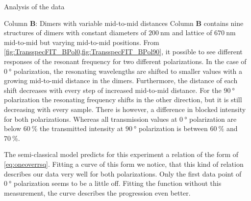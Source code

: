 \documentclass[pdftex, a4paper,11pt, twoside, UKenglish]{report}
\begin{document}
\begin{chapter}{Analysis of the data}
    \newpage
    \begin{section}{Column \textbf{B}: Dimers with variable mid-to-mid
        distances}
      \label{chp:DataB}
      Column \textbf{B} contains nine structures of dimers with constant
      diameters of $\SI{200}{\nano\meter}$ and lattice of
      $\SI{670}{\nano\meter}$ mid-to-mid but varying mid-to-mid positions. From
      \cref{fig:TransspecFIT_BPol0,fig:TransspecFIT_BPol90}, it possible to see
      different responses of the resonant frequency for two different
      polarizations. In the case of $\SI{0}{\degree}$ polarization, the
      resonating wavelengths are shifted to smaller values with a growing
      mid-to-mid distance in the dimers. Furthermore, the distance of each
      shift decreases with every step of increased mid-to-mid distance.
      For the $\SI{90}{\degree}$ polarization the resonating frequency shifts
      in the other direction, but it is still decreasing with every sample.
      There is however, a difference in blocked intensity for both
      polarizations. Whereas all transmission values at $\SI{0}{\degree}$
      polarization are below $\SI{60}{\percent}$ the transmitted intensity
      at $\SI{90}{\degree}$ polarization is between $\SI{60}{\percent}$ and 
      $\SI{70}{\percent}$.

      The semi-classical model predicts for this experiment a relation of the
      form of \cref{eq:oneoverrsq}. Fitting a curve of this form we notice,
      that this kind of relation describes our data very well for both
      polarizations. Only the first data point of $\SI{0}{\degree}$ polarization
      seems to be a little off. Fitting the function without this measurement,
      the curve describes the progression even better.
      

\end{section}
\end{chapter}
\end{document}
